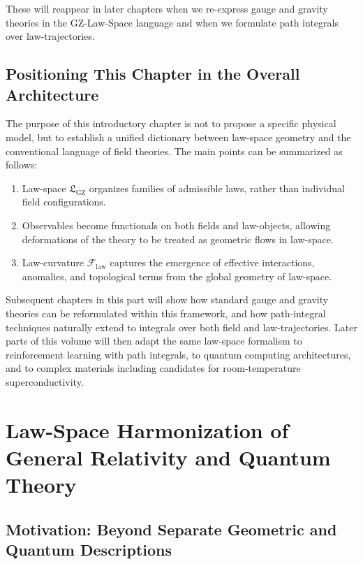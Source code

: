 \documentclass[11pt]{book}
\newcommand{\GZLS}{\ensuremath{\mathfrak{L}_{\mathrm{GZ}}}}
\newcommand{\GZLCurv}{\ensuremath{\mathcal{F}_{\mathrm{law}}}}
\theoremstyle{plain}
\theoremstyle{definition}
\theoremstyle{remark}
\begin{document}
These will reappear in later chapters when we re-express gauge and
gravity theories in the GZ-Law-Space language and when we formulate
path integrals over law-trajectories.

\section{Positioning This Chapter in the Overall Architecture}
\label{sec:phys-architecture}



The purpose of this introductory chapter is not to propose a specific
physical model, but to establish a unified dictionary between law-space
geometry and the conventional language of field theories. The main
points can be summarized as follows:
\begin{enumerate}
  \item Law-space $\GZLS$ organizes families of admissible laws, rather
        than individual field configurations.
  \item Observables become functionals on both fields and law-objects,
        allowing deformations of the theory to be treated as geometric
        flows in law-space.
  \item Law-curvature $\GZLCurv$ captures the emergence of effective
        interactions, anomalies, and topological terms from the global
        geometry of law-space.
\end{enumerate}

Subsequent chapters in this part will show how standard gauge and
gravity theories can be reformulated within this framework, and how
path-integral techniques naturally extend to integrals over both field
and law-trajectories. Later parts of this volume will then adapt the
same law-space formalism to reinforcement learning with path integrals,
to quantum computing architectures, and to complex materials including
candidates for room-temperature superconductivity.



\chapter[Law-Space Harmonization of GR and Quantum Theory]{Law-Space Harmonization of General Relativity and Quantum Theory}
\label{chap:lawspace-harmonization}

\section{Motivation: Beyond Separate Geometric and Quantum Descriptions}
\label{sec:motivation-lawspace-harmonization}
\end{document}
